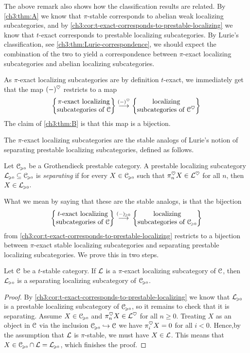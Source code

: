 \begin{remark}
    The above remark also shows how the classification results are related. By \cref{ch3:thm:A} we know that $\pi$-stable corresponds to abelian weak localizing subcategories, and by \cref{ch3:cor:t-exact-corresponds-to-prestable-localizing} we know that $t$-exact corresponds to prestable localizing subcategories. By Lurie's classification, see \cref{ch3:thm:Lurie-correspondence}, we should expect the combination of the two to yield a correspondence between $\pi$-exact localizing subcategories and abelian localizing subcategories. 
\end{remark}

As $\pi$-exact localizing subcategories are by definition $t$-exact, we immediately get that the map $(-)^\heart$ restricts to a map 
\[\piexact\overset{(-)^\heart}\to \ablocalizing\]
The claim of \cref{ch3:thm:B} is that this map is a bijection.  

The $\pi$-exact localizing subcategories are the stable analogs of Lurie's notion of separating prestable localizing subcategories, defined as follows.

\begin{definition}
    Let $\C\geqz$ be a Grothendieck prestable category. A prestable localizing subcategory $\L\geqz \subseteq \C\geqz$ is \emph{separating} if for every $X\in \C\geqz$ such that $\pi_n^\heart X\in \L^\heart$ for all $n$, then $X\in \L\geqz$. 
\end{definition}

What we mean by saying that these are the stable analogs, is that the bijection
\[\texact \overset{(-)\geqz}\to \prlocalizing\]
from \cref{ch3:cor:t-exact-corresponds-to-prestable-localizing} restricts to a bijection between $\pi$-exact stable localizing subcategories and separating prestable localizing subcategories. We prove this in two steps. 

\begin{lemma}
    \label{ch3:lm:pi-exact-then-separating}
    Let $\C$ be a $t$-stable category. If $\L$ is a $\pi$-exact localizing subcategory of $\C$, then $\L\geqz$ is a separating localizing subcategory of $\C\geqz$. 
\end{lemma}
\begin{proof}
    By \cref{ch3:cor:t-exact-corresponds-to-prestable-localizing} we know that $\L\geqz$ is a prestable localizing subcategory of $\C\geqz$, so it remains to check that it is separating. Assume $X\in \C\geqz$ and $\pi_n^\heart X \in \L^\heart$ for all $n\geq 0$. Treating $X$ as an object in $\C$ via the inclusion $\C\geqz \hookrightarrow \C$ we have $\pi_i^\heart X = 0$ for all $i<0$. Hence,by the assumption that $\L$ is $\pi$-stable, we must have $X\in \L$. This means that $X \in \C\geqz\cap \L = \L\geqz$, which finishes the proof. 
\end{proof}

